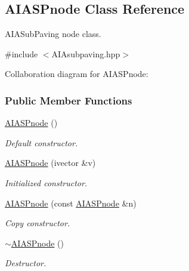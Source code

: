 \hypertarget{classAIASPnode}{\subsection{\-A\-I\-A\-S\-Pnode \-Class \-Reference}
\label{classAIASPnode}
}


\-A\-I\-A\-Sub\-Paving node class.  




{\ttfamily \#include $<$\-A\-I\-Asubpaving.\-hpp$>$}



\-Collaboration diagram for \-A\-I\-A\-S\-Pnode\-:
\subsubsection*{\-Public \-Member \-Functions}
\begin{DoxyCompactItemize}
\item 
\hyperlink{classAIASPnode_a69e70b41f415cb17b09690315320b194}{\-A\-I\-A\-S\-Pnode} ()
\begin{DoxyCompactList}\small\item\em \-Default constructor. \end{DoxyCompactList}\item 
\hyperlink{classAIASPnode_a71f172fa0bf3aba39084ea502f79f523}{\-A\-I\-A\-S\-Pnode} (ivector \&v)
\begin{DoxyCompactList}\small\item\em \-Initialized constructor. \end{DoxyCompactList}\item 
\hyperlink{classAIASPnode_a95c45cd98b8ffad6b1bec8bdbdf36c3a}{\-A\-I\-A\-S\-Pnode} (const \hyperlink{classAIASPnode}{\-A\-I\-A\-S\-Pnode} \&n)
\begin{DoxyCompactList}\small\item\em \-Copy constructor. \end{DoxyCompactList}\item 
\hyperlink{classAIASPnode_a57d10c2f272f0e78f1a72e4f5f548e77}{$\sim$\-A\-I\-A\-S\-Pnode} ()
\begin{DoxyCompactList}\small\item\em \-Destructor. \end{DoxyCompactList}\end{DoxyCompactItemize}

